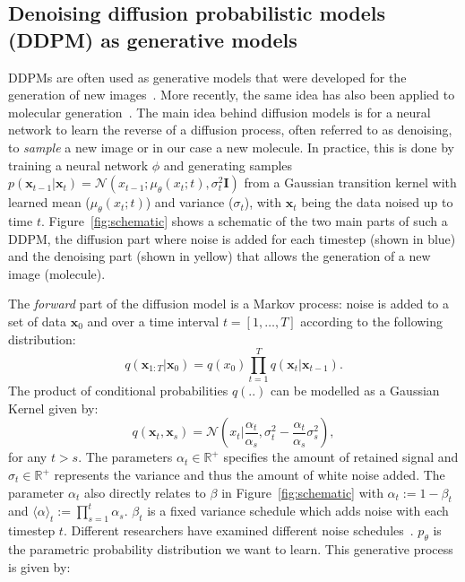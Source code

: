 \documentclass[journal=jacsat,manuscript=article]{achemso}
\begin{document}
\subsection*{Denoising diffusion probabilistic models (DDPM) as generative models}
DDPMs are often used as generative models that were developed for the generation of new images~\cite{sohl-dickstein2015deep, ho2020denoising, nichol2021improved}. More recently, the same idea has also been applied to molecular generation~\cite{hoogeboom2022equivariant}. The main idea behind diffusion models is for a neural network to learn the reverse of a diffusion process, often referred to as denoising, to \textit{sample} a new image or in our case a new molecule. In practice, this is done by training a neural network $\phi$ and generating samples $p(\mathbf{x}_{t-1}|\mathbf{x}_t)=\mathcal{N}(x_{t-1}; \mu_{\theta}(x_t;t), \sigma_t^2\mathbf{I})$ from  a Gaussian transition kernel with learned mean ($\mu_{\theta}(x_t;t)$) and variance ($\sigma_t$), with $\mathbf{x}_t$ being the data noised up to time $t$. Figure~\ref{fig:schematic} shows a schematic of the two main parts of such a DDPM, the diffusion part where noise is added for each timestep (shown in blue) and the denoising part (shown in yellow) that allows the generation of a new image (molecule).

The \textit{forward} part of the diffusion model is a Markov process: noise is added to a set of data $\mathbf{x}_0$ and over a time interval $t = [1,\ldots,T]$ according to the following distribution:
\begin{equation}
  q(\mathbf{x}_{1:T}|\mathbf{x}_0) = q(x_0)\prod_{t=1}^T q(\mathbf{x}_t|\mathbf{x}_{t-1}).
\end{equation}
The product of conditional probabilities $q(..)$ can be modelled as a Gaussian Kernel given by:
\begin{equation}
    q(\mathbf{x}_t, \mathbf{x}_s)=\mathcal{N}(x_t|\frac{\alpha_t}{\alpha_s}, \sigma_t^2-\frac{\alpha_t}{\alpha_s}\sigma^2_s),
\end{equation}
for any $t>s$. The parameters $\alpha_t \in \mathbb{R}^{+}$ specifies the amount of retained signal and $\sigma_t \in \mathbb{R}^{+}$ represents the variance and thus the amount of white noise added. The parameter $\alpha_t$ also directly relates to $\beta$ in Figure~\ref{fig:schematic} with $\alpha_t:=1-\beta_t$ and $\langle\alpha\rangle_t:=\prod_{s=1}^t\alpha_s$. $\beta_t$ is a fixed variance schedule which adds noise with each timestep $t$.
Different researchers have examined different noise schedules~\cite{sohl-dickstein2015deep, ho2020denoising}.
$p_{\theta}$ is the parametric probability distribution we want to learn. This generative process is given by:
\end{document}
